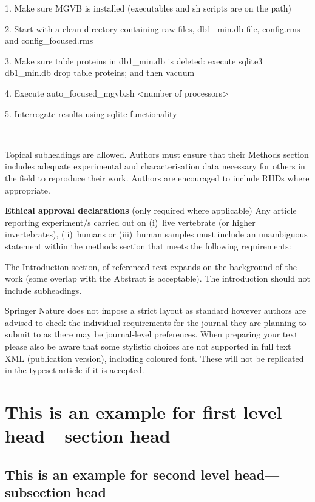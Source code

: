 \documentclass[sn-standardnature]{sn-jnl}%
\theoremstyle{thmstyleone}%
\theoremstyle{thmstyletwo}%
\theoremstyle{thmstylethree}%
\begin{document}
1. Make sure MGVB is installed (executables and sh scripts are on the path)

2. Start with a clean directory containing raw files, db1\_min.db file, config.rms and config\_focused.rms

3. Make sure table proteins in db1\_min.db is deleted: execute sqlite3 db1\_min.db drop table proteins; and then vacuum

4. Execute auto\_focused\_mgvb.sh <number of processors>

5. Interrogate results using sqlite functionality

\bigskip
\bigskip
-----------------

Topical subheadings are allowed. Authors must ensure that their Methods section includes adequate experimental and characterisation data necessary for others in the field to reproduce their work. Authors are encouraged to include RIIDs where appropriate. 

\textbf{Ethical approval declarations} (only required where applicable) Any article reporting experiment/s carried out on (i)~live vertebrate (or higher invertebrates), (ii)~humans or (iii)~human samples must include an unambiguous statement within the methods section that meets the following requirements: 




The Introduction section, of referenced text \cite{bib1} expands on the background of the work (some overlap with the Abstract is acceptable). The introduction should not include subheadings.

Springer Nature does not impose a strict layout as standard however authors are advised to check the individual requirements for the journal they are planning to submit to as there may be journal-level preferences. When preparing your text please also be aware that some stylistic choices are not supported in full text XML (publication version), including coloured font. These will not be replicated in the typeset article if it is accepted. 


\section{This is an example for first level head---section head}\label{sec3}

\subsection{This is an example for second level head---subsection head}\label{subsec2}
\end{document}
